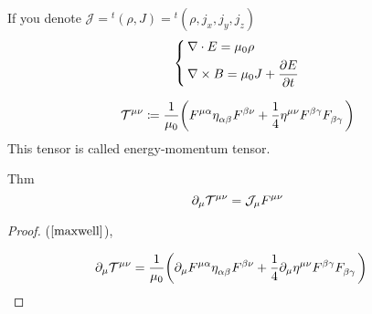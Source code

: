\documentclass[leqno]{ltjsarticle}
\begin{document}
	\begin{shadebox}
		If you denote $\mathcal J = {}^t(\rho,J) = {}^t(\rho,j_x,j_y,j_z)$
		\begin{equation}
			\left\{\,
				\begin{aligned}
					&\nabla\cdot E = \mu_0\rho\\
					&\nabla\times B = \mu_0J + \pdv{E}{t}
				\end{aligned}
			\right.
		\end{equation}
	\end{shadebox}
	\begin{equation}
		\tensor{\mathcal T}{^\mu^\nu} \coloneq \frac{1}{\mu_0}\qty(\tensor{F}{^\mu^\alpha}\tensor{\eta}{_\alpha_\beta}\tensor{F}{^\beta^\nu} + \frac{1}{4}\tensor{\eta}{^\mu^\nu}\tensor{F}{^\beta^\gamma}\tensor{F}{_\beta_\gamma}) 
	\end{equation}
		This tensor is called energy-momentum tensor.
	\begin{itembox}[l]{Thm}
		\begin{equation}
			\partial_\mu \tensor{\mathcal T}{^\mu^\nu} = \mathcal J_{\mu}\tensor{F}{^\mu^\nu}
		\end{equation}
	\end{itembox}
	\begin{proof}
		 ($\ref{maxwell}$), 
		
	\begin{align*}

		\partial_\mu \tensor{\mathcal T}{^\mu^\nu}&= \frac{1}{\mu_0}\qty(\partial_{\mu}\tensor{F}{^\mu^\alpha}\tensor{\eta}{_\alpha_\beta}\tensor{F}{^\beta^\nu} + \frac{1}{4}\partial_{\mu}\tensor{\eta}{^\mu^\nu}\tensor{F}{^\beta^\gamma}\tensor{F}{_\beta_\gamma})
	\end{align*}
\end{proof}
\end{document}
